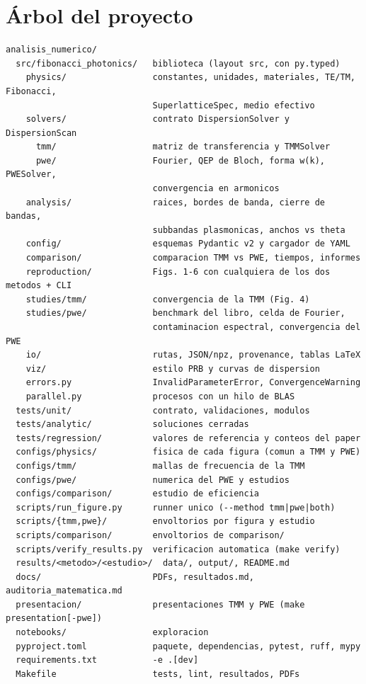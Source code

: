 \documentclass[11pt,a4paper]{article}
\begin{document}
\section{Árbol del proyecto}

\begin{lstlisting}
analisis_numerico/
  src/fibonacci_photonics/   biblioteca (layout src, con py.typed)
    physics/                 constantes, unidades, materiales, TE/TM, Fibonacci,
                             SuperlatticeSpec, medio efectivo
    solvers/                 contrato DispersionSolver y DispersionScan
      tmm/                   matriz de transferencia y TMMSolver
      pwe/                   Fourier, QEP de Bloch, forma w(k), PWESolver,
                             convergencia en armonicos
    analysis/                raices, bordes de banda, cierre de bandas,
                             subbandas plasmonicas, anchos vs theta
    config/                  esquemas Pydantic v2 y cargador de YAML
    comparison/              comparacion TMM vs PWE, tiempos, informes
    reproduction/            Figs. 1-6 con cualquiera de los dos metodos + CLI
    studies/tmm/             convergencia de la TMM (Fig. 4)
    studies/pwe/             benchmark del libro, celda de Fourier,
                             contaminacion espectral, convergencia del PWE
    io/                      rutas, JSON/npz, provenance, tablas LaTeX
    viz/                     estilo PRB y curvas de dispersion
    errors.py                InvalidParameterError, ConvergenceWarning
    parallel.py              procesos con un hilo de BLAS
  tests/unit/                contrato, validaciones, modulos
  tests/analytic/            soluciones cerradas
  tests/regression/          valores de referencia y conteos del paper
  configs/physics/           fisica de cada figura (comun a TMM y PWE)
  configs/tmm/               mallas de frecuencia de la TMM
  configs/pwe/               numerica del PWE y estudios
  configs/comparison/        estudio de eficiencia
  scripts/run_figure.py      runner unico (--method tmm|pwe|both)
  scripts/{tmm,pwe}/         envoltorios por figura y estudio
  scripts/comparison/        envoltorios de comparison/
  scripts/verify_results.py  verificacion automatica (make verify)
  results/<metodo>/<estudio>/  data/, output/, README.md
  docs/                      PDFs, resultados.md, auditoria_matematica.md
  presentacion/              presentaciones TMM y PWE (make presentation[-pwe])
  notebooks/                 exploracion
  pyproject.toml             paquete, dependencias, pytest, ruff, mypy
  requirements.txt           -e .[dev]
  Makefile                   tests, lint, resultados, PDFs
\end{lstlisting}
\end{document}
